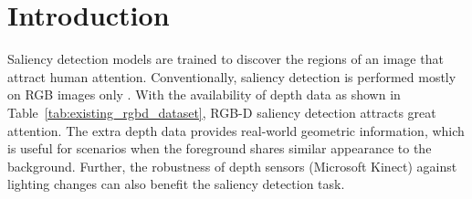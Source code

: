 \documentclass[10pt,twocolumn,letterpaper]{article}
\begin{document}
\section{Introduction}
\label{sec:intro}
Saliency detection models are trained to discover the regions of an image that attract human attention. Conventionally, saliency detection is performed mostly
on RGB images only
\cite{BASNet_Sal,SCRN_iccv,F3Net_aaai2020,Iter_Coop_CVPR,A2dele_cvpr2020}. With the availability of
depth data as shown in Table~\ref{tab:existing_rgbd_dataset},
RGB-D saliency detection \cite{jing2020uc,dmra_iccv19, zhang2020bilateral,zhao2019Contrast} attracts
great attention. The extra depth data provides real-world geometric information, which is useful for scenarios when the foreground shares similar appearance to
the background. Further, the robustness of depth sensors (\eg Microsoft Kinect) against lighting changes can also benefit the saliency detection task.
\end{document}
